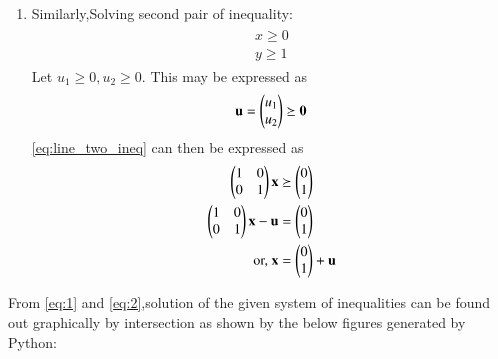 \documentclass[journal,12pt,twocolumn]{IEEEtran}
\begin{document}
\begin{enumerate}
    \item Similarly,Solving second pair of inequality:
    \begin{align}
\label{eq:line_two_ineq}
\begin{split}
    x\geq 0
\\
    y \geq 1
\end{split}
\end{align}
\solution  Let $u_1 \ge 0, u_2 \ge 0$.  This may be expressed as
\begin{align}
\mathbf{u} = \begin{pmatrix}u_1\\u_2\end{pmatrix}\succeq \mathbf{0}
\end{align}
%
\eqref{eq:line_two_ineq} can then be expressed as
\begin{align}
\begin{pmatrix}1 & 0 \\ 0 & 1\end{pmatrix}\mathbf{x}  &\succeq \begin{pmatrix}0\\1\end{pmatrix}
\\
\begin{pmatrix}1 & 0 \\ 0 & 1\end{pmatrix}\mathbf{x}  -\mathbf{u}&=\begin{pmatrix}0\\1\end{pmatrix}
\\
\text{or, }
\mathbf{x} &= \begin{pmatrix}0\\1\end{pmatrix} +\mathbf{u}\label{eq:2}
\end{align}
\end{enumerate}
From \eqref{eq:1} and \eqref{eq:2},solution of the given system of inequalities can be found out graphically by intersection as shown by the below figures generated by Python:
\end{document}
